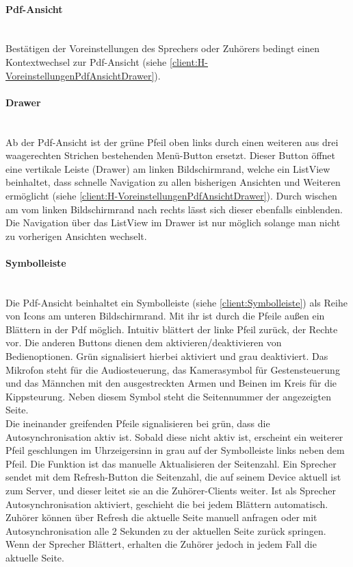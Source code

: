 \paragraph{Pdf-Ansicht}$\;$\\
Bestätigen der Voreinstellungen des Sprechers oder Zuhörers bedingt einen Kontextwechsel zur Pdf-Ansicht (siehe \autoref{client:H-VoreinstellungenPdfAnsichtDrawer}).
\paragraph{Drawer}$\;$\\
Ab der Pdf-Ansicht ist der grüne Pfeil oben links durch einen weiteren aus drei waagerechten Strichen bestehenden Menü-Button ersetzt. Dieser Button öffnet eine vertikale Leiste (Drawer) am linken Bildschirmrand, welche ein ListView beinhaltet, dass schnelle Navigation zu allen bisherigen Ansichten und Weiteren ermöglicht (siehe \autoref{client:H-VoreinstellungenPdfAnsichtDrawer}). Durch wischen am vom linken Bildschirmrand nach rechts lässt sich dieser ebenfalls einblenden. Die Navigation über das ListView im Drawer ist nur möglich solange man nicht zu vorherigen Ansichten wechselt. 
\paragraph{Symbolleiste}$\;$\\
Die Pdf-Ansicht beinhaltet ein Symbolleiste (siehe \autoref{client:Symbolleiste}) als Reihe von Icons am unteren Bildschirmrand. Mit ihr ist durch die Pfeile außen ein Blättern in der Pdf möglich. Intuitiv blättert der linke Pfeil zurück, der Rechte vor. Die anderen Buttons dienen dem aktivieren/deaktivieren von Bedienoptionen. Grün signalisiert hierbei aktiviert und grau deaktiviert. Das Mikrofon steht für die Audiosteuerung, das Kamerasymbol für  Gestensteuerung und das Männchen mit den ausgestreckten Armen und Beinen im Kreis für die Kippsteurung. Neben diesem Symbol steht die Seitennummer der angezeigten Seite.
\\Die ineinander greifenden Pfeile signalisieren bei grün, dass die Autosynchronisation aktiv ist. Sobald diese nicht aktiv ist, erscheint ein weiterer Pfeil geschlungen im Uhrzeigersinn in grau auf der Symbolleiste links neben dem Pfeil. Die Funktion ist das manuelle Aktualisieren der Seitenzahl. Ein Sprecher sendet mit dem Refresh-Button die Seitenzahl, die auf seinem Device aktuell ist zum Server, und dieser leitet sie an die Zuhörer-Clients weiter. Ist als Sprecher Autosynchronisation aktiviert, geschieht die bei jedem Blättern automatisch. Zuhörer können über Refresh die aktuelle Seite manuell anfragen oder mit Autosynchronisation alle 2 Sekunden zu der aktuellen Seite zurück springen. Wenn der Sprecher Blättert, erhalten die Zuhörer jedoch in jedem Fall die aktuelle Seite.

